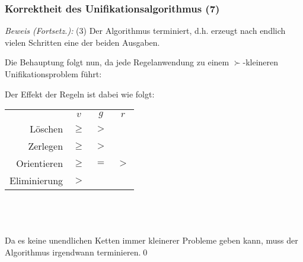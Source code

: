 \documentclass[aspectratio=1610,onlymath]{beamer}
\begin{document}
\begin{frame}[t]\frametitle{Korrektheit des Unifikationsalgorithmus (7)}


\emph{Beweis (Fortsetz.):} (3) Der Algorithmus terminiert, d.h. erzeugt nach endlich vielen Schritten eine der beiden Ausgaben.
\smallskip

Die Behauptung folgt nun, da jede Regelanwendung zu einem $\succ$-kleineren Unifikationsproblem führt:\pause


Der Effekt der Regeln ist dabei wie folgt:

\begin{tabular}{@{}rccc}
	& $v$ & $g$ & $r$ \\[-0.5ex]
\alert{Löschen} & $\geq$ & $>$ & \\[-0.5ex]
\alert{Zerlegen} & $\geq$ & $>$ & \\[-0.5ex]
\alert{Orientieren} & $\geq$ & $=$ & $>$ \\[-0.5ex]
\alert{Eliminierung} & $>$ & &
\end{tabular}\hspace{5mm}
\begin{minipage}{5.0cm}
~\\~\\~\\
Da es keine unendlichen Ketten immer kleinerer Probleme geben kann, muss der Algorithmus irgendwann terminieren.\qed
\end{minipage}

\end{frame}
\end{document}
